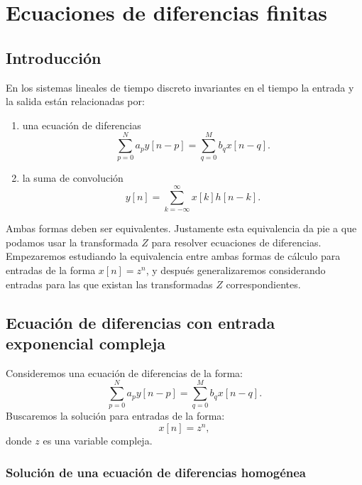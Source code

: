 \chapter{Ecuaciones de diferencias finitas}

\section{Introducci\'{o}n}

En los sistemas lineales de tiempo discreto invariantes en el tiempo la entrada y la salida est\'{a}n relacionadas por:
\begin{enumerate}
	\item una ecuaci\'{o}n de diferencias 
	\begin{equation}
		\sum_{p=0}^{N}a_{p} y[n-p] = \sum_{q=0}^{M}b_{q} x[n-q]. \label{eqdiferencia}
	\end{equation}
	
	\item la suma de convoluci\'{o}n
	\begin{equation}
		y[n] = \sum_{k=-\infty}^{\infty} x[k] h[n - k].
	\end{equation}
\end{enumerate}

Ambas formas deben ser equivalentes. Justamente esta equivalencia da pie a que podamos usar la transformada $Z$ para resolver ecuaciones de diferencias. Empezaremos estudiando la equivalencia entre ambas formas de c\'{a}lculo para entradas de la forma $x[n] = z^{n}$, y despu\'{e}s generalizaremos considerando entradas para las que existan las transformadas $Z$ correspondientes.

\section{Ecuaci\'{o}n de diferencias con entrada exponencial compleja}

Consideremos una ecuaci\'{o}n de diferencias de la forma:
\begin{equation}
	\sum_{p=0}^{N}a_{p} y[n-p] = \sum_{q=0}^{M}b_{q} x[n-q].
\end{equation}
Buscaremos la soluci\'{o}n para entradas de la forma:
\begin{equation}
	x[n] = z^n,
\end{equation}
donde $z$ es una variable compleja.

\subsection{Soluci\'{o}n de una ecuaci\'{o}n de diferencias homog\'{e}nea}

